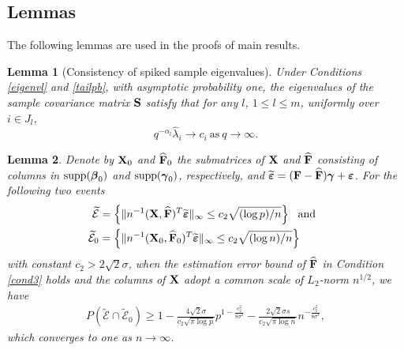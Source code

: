 \documentclass{statsoc}
\newtheorem{lemma}{Lemma}
\newcommand{\bF}{\mbox{\bf F}}
\newcommand{\bS}{\mbox{\bf S}}
\newcommand{\bX}{\mbox{\bf X}}
\newcommand{\bveps}{\mbox{\boldmath $\varepsilon$}}
\newcommand{\bbeta}{\mbox{\boldmath $\beta$}}
\newcommand{\bgamma}{\mbox{\boldmath $\gamma$}}
\newcommand{\supp}{\mathrm{supp}}
\def\t{^T}
\begin{document}
\subsection{Lemmas} \label{Seclem}

\smallskip

The following lemmas are used in the proofs of main results.
\begin{lemma}[Consistency of spiked sample eigenvalues] \label{Thm1}
Under Conditions \ref{eigenvl} and \ref{tailpb}, with asymptotic probability one, the eigenvalues of the sample covariance matrix $\bS$ satisfy that for any $l$, $1 \leq l \leq m$, uniformly over $i \in J_l$,
\[q^{-\alpha_l}\widehat{\lambda}_i \to c_i \ \text{as} \ q \to \infty.\]
\end{lemma}

\begin{lemma} \label{L3}
Denote by $\bX_0$ and $\widehat{\bF}_0$ the submatrices of $\bX$ and $\widehat{\bF}$ consisting of columns in $\supp(\bbeta_0)$ and $\supp(\bgamma_0)$, respectively, and $\widetilde{\bveps} = (\bF - \widehat{\bF}) \bgamma + \bveps$. For the following two events
\begin{align*}
\widetilde{\mathcal{E}} &= \left\{\|n^{-1} (\bX, \widehat{\bF})\t \widetilde{\bveps}\|_{\infty} \leq c_2 \sqrt{(\log p)/n} \right\} \ \text{ and } \ \\
\widetilde{\mathcal{E}}_0 &= \left\{\|n^{-1} (\bX_0, \widehat{\bF}_0)\t \widetilde{\bveps}\|_{\infty} \leq c_2 \sqrt{(\log n)/n}\right\}
\end{align*}
with constant $c_2 > 2\sqrt{2}\sigma$, when the estimation error bound of $\widehat{\bF}$ in Condition \ref{cond3} holds and the columns of $\bX$ adopt a common scale of $L_2$-norm $n^{1/2}$, we have
\begin{align*}
P(\widetilde{\mathcal{E}} \cap \widetilde{\mathcal{E}}_0) \geq 1 - \frac{4\sqrt{2}\sigma}{c_2 \sqrt{\pi \log p}} p^{1 - \frac{c_2^2}{8 \sigma^2}} - \frac{2\sqrt{2}\sigma s}{c_2 \sqrt{\pi \log n}} n^{-\frac{c_2^2}{8 \sigma^2}},
\end{align*}
which converges to one as $n \to \infty$.
\end{lemma}

\end{document}
